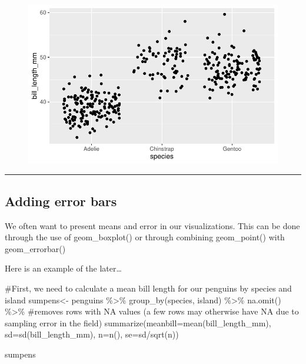 \documentclass[
  letterpaper,
  DIV=11,
  numbers=noendperiod]{scrartcl}
\newenvironment{Shaded}{\begin{snugshade}}{\end{snugshade}}
\newcommand{\AttributeTok}[1]{\textcolor[rgb]{0.40,0.45,0.13}{#1}}
\newcommand{\CommentTok}[1]{\textcolor[rgb]{0.37,0.37,0.37}{#1}}
\newcommand{\FunctionTok}[1]{\textcolor[rgb]{0.28,0.35,0.67}{#1}}
\newcommand{\NormalTok}[1]{\textcolor[rgb]{0.00,0.23,0.31}{#1}}
\newcommand{\OtherTok}[1]{\textcolor[rgb]{0.00,0.23,0.31}{#1}}
\newcommand{\SpecialCharTok}[1]{\textcolor[rgb]{0.37,0.37,0.37}{#1}}
\begin{document}
\begin{figure}[H]

{\centering \includegraphics{basic_graphs_files/figure-pdf/unnamed-chunk-17-1.pdf}

}

\end{figure}

\begin{center}\rule{0.5\linewidth}{0.5pt}\end{center}

\subsection{\texorpdfstring{\textbf{Adding error
bars}}{Adding error bars}}

We often want to present means and error in our visualizations. This can
be done through the use of geom\_boxplot() or through combining
geom\_point() with geom\_errorbar()

Here is an example of the later\ldots{}

\begin{Shaded}
\begin{Highlighting}[]
\CommentTok{\#First, we need to calculate a mean bill length for our penguins by species and island}
\NormalTok{sumpens}\OtherTok{\textless{}{-}}\NormalTok{ penguins }\SpecialCharTok{\%\textgreater{}\%}
  \FunctionTok{group\_by}\NormalTok{(species, island) }\SpecialCharTok{\%\textgreater{}\%}
  \FunctionTok{na.omit}\NormalTok{() }\SpecialCharTok{\%\textgreater{}\%} \CommentTok{\#removes rows with NA values (a few rows may otherwise have NA due to sampling error in the field)}
  \FunctionTok{summarize}\NormalTok{(}\AttributeTok{meanbill=}\FunctionTok{mean}\NormalTok{(bill\_length\_mm), }\AttributeTok{sd=}\FunctionTok{sd}\NormalTok{(bill\_length\_mm), }\AttributeTok{n=}\FunctionTok{n}\NormalTok{(), }\AttributeTok{se=}\NormalTok{sd}\SpecialCharTok{/}\FunctionTok{sqrt}\NormalTok{(n))}

\NormalTok{sumpens}
\end{Highlighting}
\end{Shaded}
\end{document}
